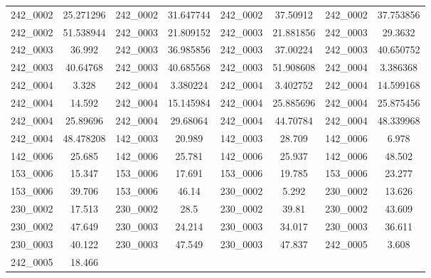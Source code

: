\begin{table}[H]
\begin{tabular}{|c|c|c|c|c|c|c|c|}
        242\_0002 & 25.271296 & 242\_0002 & 31.647744 & 242\_0002 & 37.50912 & 242\_0002 & 37.753856 \\
        242\_0002 & 51.538944 & 242\_0003 & 21.809152 & 242\_0003 & 21.881856 & 242\_0003 & 29.3632 \\
        242\_0003 & 36.992 & 242\_0003 & 36.985856 & 242\_0003 & 37.00224 & 242\_0003 & 40.650752 \\
        242\_0003 & 40.64768 & 242\_0003 & 40.685568 & 242\_0003 & 51.908608 & 242\_0004 & 3.386368 \\
        242\_0004 & 3.328 & 242\_0004 & 3.380224 & 242\_0004 & 3.402752 & 242\_0004 & 14.599168 \\
        242\_0004 & 14.592 & 242\_0004 & 15.145984 & 242\_0004 & 25.885696 & 242\_0004 & 25.875456 \\
        242\_0004 & 25.89696 & 242\_0004 & 29.68064 & 242\_0004 & 44.70784 & 242\_0004 & 48.339968 \\
        242\_0004 & 48.478208 & 142\_0003 & 20.989 & 142\_0003 & 28.709 & 142\_0006 & 6.978 \\
        142\_0006 & 25.685 & 142\_0006 & 25.781 & 142\_0006 & 25.937 & 142\_0006 & 48.502 \\
        153\_0006 & 15.347 & 153\_0006 & 17.691 & 153\_0006 & 19.785 & 153\_0006 & 23.277 \\
        153\_0006 & 39.706 & 153\_0006 & 46.14 & 230\_0002 & 5.292 & 230\_0002 & 13.626 \\
        230\_0002 & 17.513 & 230\_0002 & 28.5 & 230\_0002 & 39.81 & 230\_0002 & 43.609 \\
        230\_0002 & 47.649 & 230\_0003 & 24.214 & 230\_0003 & 34.017 & 230\_0003 & 36.611 \\
        230\_0003 & 40.122 & 230\_0003 & 47.549 & 230\_0003 & 47.837 & 242\_0005 & 3.608 \\
        242\_0005 & 18.466 & & & & & & \\
        \hline
    \end{tabular}
\end{table}
